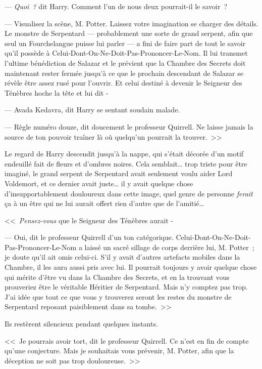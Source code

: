 --- \emph{Quoi~?} dit Harry. Comment l'un de nous deux pourrait-il le savoir~?

--- Visualisez la scène, M. Potter. Laissez votre imagination se charger des détails. Le monstre de Serpentard — probablement une sorte de grand serpent, afin que seul un Fourchelangue puisse lui parler — a fini de faire part de tout le savoir qu'il possède à Celui-Dont-On-Ne-Doit-Pas-Prononcer-Le-Nom. Il lui transmet l'ultime bénédiction de Salazar et le prévient que la Chambre des Secrets doit maintenant rester fermée jusqu'à ce que le prochain descendant de Salazar se révèle être assez rusé pour l'ouvrir. Et celui destiné à devenir le Seigneur des Ténèbres hoche la tête et lui dit -

--- Avada Kedavra, dit Harry se sentant soudain malade.

--- Règle numéro douze, dit doucement le professeur Quirrell. Ne laisse jamais la source de ton pouvoir traîner là où quelqu'un pourrait la trouver.~>>

Le regard de Harry descendit jusqu'à la nappe, qui s'était décorée d'un motif endeuillé fait de fleurs et d'ombres noires. Cela semblait… trop triste pour être imaginé, le grand serpent de Serpentard avait seulement voulu aider Lord Voldemort, et ce dernier avait juste… il y avait quelque chose d'insupportablement douloureux dans cette image, quel genre de personne \emph{ferait} ça à un être qui ne lui aurait offert rien d'autre que de l'amitié…

<<~\emph{Pensez-vous} que le Seigneur des Ténèbres aurait -

--- Oui, dit le professeur Quirrell d'un ton catégorique. Celui-Dont-On-Ne-Doit-Pas-Prononcer-Le-Nom a laissé un sacré sillage de corps derrière lui, M. Potter~; je doute qu'il ait omis celui-ci. S'il y avait d'autres artefacts mobiles dans la Chambre, il les aura aussi pris avec lui. Il pourrait toujours y avoir quelque chose qui mérite d'être vu dans la Chambre des Secrets, et en la trouvant vous prouveriez être le véritable Héritier de Serpentard. Mais n'y comptez pas trop. J'ai idée que tout ce que vous y trouverez seront les restes du monstre de Serpentard reposant paisiblement dans sa tombe.~>>

Ils restèrent silencieux pendant quelques instants.

<<~Je pourrais avoir tort, dit le professeur Quirrell. Ce n'est en fin de compte qu'une conjecture. Mais je souhaitais vous prévenir, M. Potter, afin que la déception ne soit pas trop douloureuse.~>>


